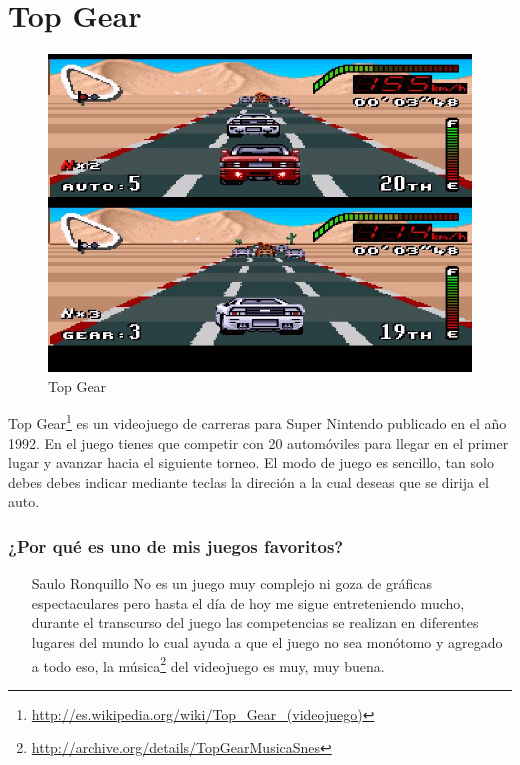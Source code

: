 \section{Top Gear}

\begin{figure}[htbp]
\begin{center}
\includegraphics[width=.60\textwidth]{./imagenes/top_gear.jpg}
\caption{Top Gear}
\label{Top Gear}
\end{center}
\end{figure}
Top Gear\footnote{\url{http://es.wikipedia.org/wiki/Top_Gear_(videojuego)}} es un videojuego de carreras para Super Nintendo publicado en el año 1992. En el juego tienes que competir con 20 automóviles para llegar en el primer lugar y avanzar hacia el siguiente torneo. El modo de juego es sencillo, tan solo debes debes indicar mediante teclas la direción a la cual deseas que se dirija el auto.

\subsubsection{¿Por qué es uno de mis juegos favoritos?}
\begin{itemize}
	\item[Saulo Ronquillo]No es un juego muy complejo ni goza de gráficas espectaculares pero hasta el día de hoy me sigue entreteniendo mucho, durante el transcurso del juego las competencias se realizan en diferentes lugares del mundo lo cual ayuda a que el juego no sea monótomo y agregado a todo eso, la música\footnote{\url{http://archive.org/details/TopGearMusicaSnes}} del videojuego es muy, muy buena.
\end{itemize}
